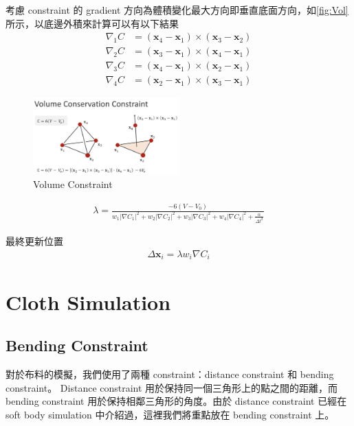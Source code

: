 \documentclass{article}
\begin{document}
考慮 constraint 的 gradient 方向為體積變化最大方向即垂直底面方向，如\autoref{fig:Vol}所示，以底邊外積來計算可以有以下結果
\begin{align}
  \nabla_1 C & = (\mathbf{x}_4 - \mathbf{x}_1) \times (\mathbf{x}_3 - \mathbf{x}_2) \\
  \nabla_2 C & = (\mathbf{x}_3 - \mathbf{x}_1) \times (\mathbf{x}_4 - \mathbf{x}_1) \\
  \nabla_3 C & = (\mathbf{x}_4 - \mathbf{x}_1) \times (\mathbf{x}_2 - \mathbf{x}_1) \\
  \nabla_4 C & = (\mathbf{x}_2 - \mathbf{x}_1) \times (\mathbf{x}_3 - \mathbf{x}_1)
\end{align}

\begin{figure}[!ht]
  \centering
  \includegraphics[width=0.5\textwidth]{./figures/volumeConstraint.png}
  \caption{Volume Constraint}
  \label{fig:Vol}
\end{figure}

\begin{align}
  \lambda = \frac{-6(V - V_0)}{w_1\left|\nabla C_1\right|^2 + w_2\left|\nabla C_2\right|^2 + w_3\left|\nabla C_3\right|^2 + w_4\left|\nabla C_4\right|^2 + \frac{\alpha}{\Delta t ^ 2}}
\end{align}

最終更新位置
\begin{align}
  \Delta \mathbf{x}_i = \lambda w_i \nabla C_i
\end{align}

\section*{Cloth Simulation}

\subsection*{Bending Constraint}

對於布料的模擬，我們使用了兩種 constraint：distance constraint 和 bending constraint。
Distance constraint 用於保持同一個三角形上的點之間的距離，而 bending constraint 用於保持相鄰三角形的角度。由於 distance constraint 已經在 soft body simulation 中介紹過，這裡我們將重點放在 bending constraint 上。
\end{document}
